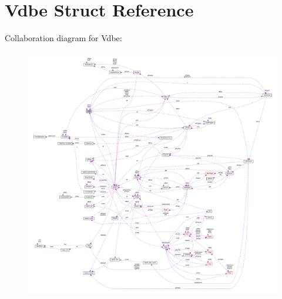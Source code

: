 \hypertarget{struct_vdbe}{\section{Vdbe Struct Reference}
\label{struct_vdbe}
}


Collaboration diagram for Vdbe\-:\nopagebreak
\begin{figure}[H]
\begin{center}
\leavevmode
\includegraphics[width=350pt]{struct_vdbe__coll__graph}
\end{center}
\end{figure}
